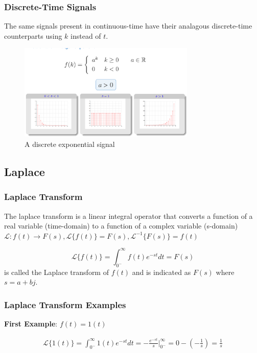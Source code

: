 \documentclass[11pt]{article}
\begin{document}
\subsubsection{Discrete-Time Signals}
The same signals present in continuous-time have their analagous discrete-time counterparts using $k$ instead of $t$.

\begin{figure}[htbp]
  \centerline{\includegraphics[width=0.75\textwidth]{../../images/discrete_exponential.png}}
  \caption{A discrete exponential signal}
  \label{fig:discrete_exponential}
\end{figure}

\subsection{Laplace}
\subsubsection{Laplace Transform}
The laplace transform is a linear integral operator that converts a function of a real variable (time-domain) to a function of a complex variable (s-domain) $ \mathcal{L}  : f(t) \longrightarrow F(s), \mathcal{L} \{ f(t)\} = F(s), \mathcal{L}^{-1} \{ F(s) \} = f(t)$

\begin{equation}
  \mathcal{L} \{ f(t) \} = \int_{0^{-}}^{\infty} f(t) e^{-st} dt = F(s)
\end{equation}
is called the Laplace transform of $f(t)$ and is indicated as $F(s)$ where $s = a + bj $.

\subsubsection{Laplace Transform Examples}
\textbf{First Example}: $f(t) = 1(t)$

\begin{gather}
  \mathcal{L} \{ 1(t) \}  =  \int_{0^-}^{\infty} 1(t) e^{-st} dt = - \frac{e^{-st}}{s} |_{0^-}^{\infty}= 0 - (-\frac{1}{s}) = \frac{1}{s}
\end{gather}
\end{document}
